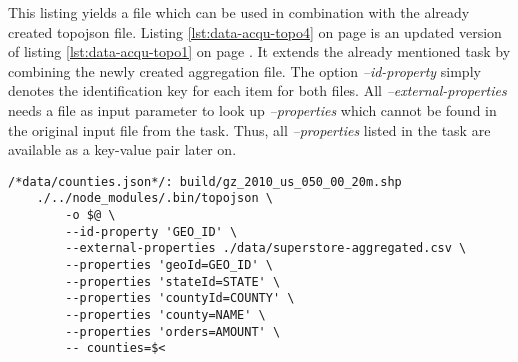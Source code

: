 This listing yields a file which can be used in combination with the already created topojson file. Listing \ref{lst:data-acqu-topo4} on page \pageref{lst:data-acqu-topo4} is an updated version of listing \ref{lst:data-acqu-topo1} on page \pageref{lst:data-acqu-topo1}. It extends the already mentioned task by combining the newly created aggregation file. The option \textit{--id-property} simply denotes the identification key for each item for both files. All \textit{--external-properties} needs a file as input parameter to look up \textit{--properties} which cannot be found in the original input file from the task. Thus, all \textit{--properties} listed in the task are available as a key-value pair later on.

\begin{lstlisting}[style={makefile}, caption={Make task for merging a file with topojson}, label={lst:data-acqu-topo4}]
/*data/counties.json*/: build/gz_2010_us_050_00_20m.shp
    ./../node_modules/.bin/topojson \
        -o $@ \
        --id-property 'GEO_ID' \
        --external-properties ./data/superstore-aggregated.csv \
        --properties 'geoId=GEO_ID' \
        --properties 'stateId=STATE' \
        --properties 'countyId=COUNTY' \
        --properties 'county=NAME' \
        --properties 'orders=AMOUNT' \
        -- counties=$<
\end{lstlisting}